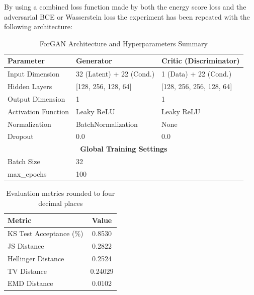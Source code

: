 By using a combined loss function made by both the energy score loss and the adversarial BCE or Wasserstein loss
the experiment has been repeated with the following architecture:


\begin{table}[H]
\centering
\caption{ForGAN Architecture and Hyperparameters Summary}
\label{tab:forgan_hybrid_architecture}
\begin{tabular}{lll}
\hline
\textbf{Parameter}         & \textbf{Generator}                  & \textbf{Critic (Discriminator)} \\ \hline
Input Dimension            & 32 (Latent) + 22 (Cond.)           & 1 (Data) + 22 (Cond.)           \\
Hidden Layers              & [128, 256, 128, 64]                & [128, 256, 256, 128, 64]        \\
Output Dimension           & 1                                  & 1                               \\
Activation Function        & Leaky ReLU                         & Leaky ReLU                      \\
Normalization              & BatchNormalization                 & None                            \\
Dropout                    & 0.0                                & 0.0                             \\
\multicolumn{3}{c}{\textbf{Global Training Settings}}                                      \\ \hline
Batch Size                 & \multicolumn{2}{l}{32}                                            \\
max\_epochs                & \multicolumn{2}{l}{100}                                          \\
\hline
\end{tabular}
\end{table}




\begin{table}[h]
\centering
\begin{tabular}{l c}
\hline
\textbf{Metric} & \textbf{Value} \\
\hline
\label{tab:hybrid_forgan_results}
KS Test Acceptance (\%) & 0.8530 \\
JS Distance & 0.2822 \\
Hellinger Distance & 0.2524 \\
TV Distance & 0.24029 \\
EMD Distance & 0.0102\\
\hline
\end{tabular}
\caption{Evaluation metrics rounded to four decimal places}
\end{table}
    


